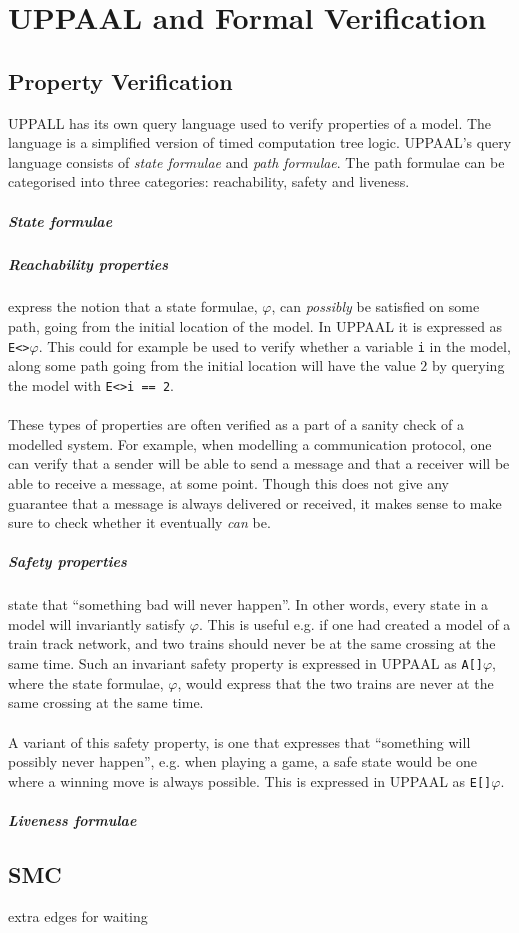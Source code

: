 \chapter{UPPAAL and Formal Verification}
\section{Property Verification}
UPPALL has its own query language used to verify properties of a model\cite[p. 7]{upptut}. The language is a simplified version of timed computation tree logic. UPPAAL's query language consists of \textit{state formulae} and \textit{path formulae}. The path formulae can be categorised into three categories: reachability, safety and liveness.

\paragraph{State formulae}
\paragraph{Reachability properties} express the notion that a state formulae, $\varphi$, can \textit{possibly} be satisfied on some path, going from the initial location of the model. In UPPAAL it is expressed as \texttt{E<>$\varphi$}. This could for example be used to verify whether a variable \texttt{i} in the model, along some path going from the initial location will have the value $2$ by querying the model with \texttt{E<>i == 2}.\\\\
These types of properties are often verified as a part of a sanity check of a modelled system\cite[p. 8]{upptut}. For example, when modelling a communication protocol, one can verify that a sender will be able to send a message and that a receiver will be able to receive a message, at some point. Though this does not give any guarantee that a message is always delivered or received, it makes sense to make sure to check whether it eventually \textit{can} be.
\paragraph{Safety properties} state that ``something bad will never happen''. In other words, every state in a model will invariantly satisfy $\varphi$. This is useful e.g. if one had created a model of a train track network, and two trains should never be at the same crossing at the same time. Such an invariant safety property is expressed in UPPAAL as \texttt{A[]$\varphi$}, where the state formulae, $\varphi$, would express that the two trains are never at the same crossing at the same time.\\\\
A variant of this safety property, is one that expresses that ``something will possibly never happen'', e.g. when playing a game, a safe state would be one where a winning move is always possible. This is expressed in UPPAAL as \texttt{E[]$\varphi$}.

\paragraph{Liveness formulae}

\section{SMC}
extra edges for waiting